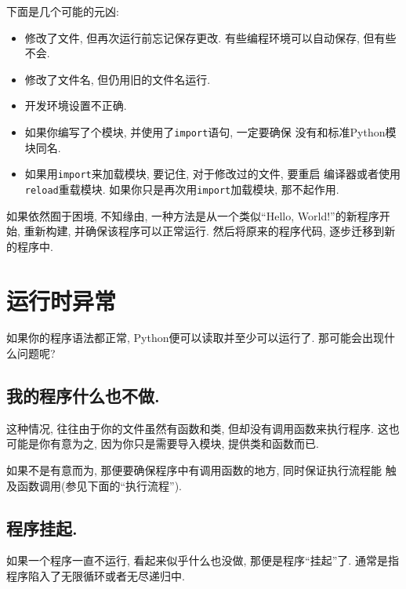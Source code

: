 \documentclass[10pt]{book}
\begin{document}
下面是几个可能的元凶:

\begin{itemize}

\item 修改了文件, 但再次运行前忘记保存更改. 有些编程环境可以自动保存, 但有些不会. 

\item 修改了文件名, 但仍用旧的文件名运行. 

\item 开发环境设置不正确. 

\item 如果你编写了个模块, 并使用了{\tt import}语句, 一定要确保
没有和标准Python模块同名. 

\item 如果用{\tt import}来加载模块, 要记住, 对于修改过的文件, 要重启
编译器或者使用{\tt reload}重载模块. 
如果你只是再次用{\tt import}加载模块, 那不起作用. 

\end{itemize}

如果依然囿于困境, 不知缘由, 
一种方法是从一个类似``Hello, World!''的新程序开始, 重新构建, 
并确保该程序可以正常运行. 
然后将原来的程序代码, 逐步迁移到新的程序中. 


\section{运行时异常}

如果你的程序语法都正常, Python便可以读取并至少可以运行了. 
那可能会出现什么问题呢?


\subsection{我的程序什么也不做.}

这种情况, 往往由于你的文件虽然有函数和类, 但却没有调用函数来执行程序. 
这也可能是你有意为之, 因为你只是需要导入模块, 提供类和函数而已. 

如果不是有意而为, 那便要确保程序中有调用函数的地方, 同时保证执行流程能
触及函数调用(参见下面的``执行流程''). 


\subsection{程序挂起.}

如果一个程序一直不运行, 看起来似乎什么也没做, 那便是程序``挂起''了. 
通常是指程序陷入了无限循环或者无尽递归中. 
\end{document}
